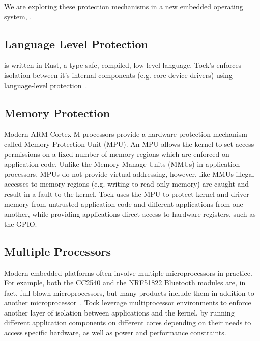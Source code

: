 We are exploring these protection mechanisms in a new embedded operating system,
\name.

\subsection{Language Level Protection}

\name is written in Rust, a type-safe, compiled, low-level language. Tock's
enforces isolation between it's internal components (e.g. core device drivers)
using language-level protection~.

\subsection{Memory Protection}

Modern ARM Cortex-M processors provide a hardware protection mechanism called
Memory Protection Unit (MPU).  An MPU allows the kernel to set access
permissions on a fixed number of memory regions which are enforced on
application code. Unlike the Memory Manage Units (MMUs) in application
processors, MPUs do not provide virtual addressing, however, like MMUs illegal
accesses to memory regions (e.g. writing to read-only memory) are caught and
result in a fault to the kernel. Tock uses the MPU to protect kernel and driver
memory from untrusted application code and different applications from one
another, while providing applications direct access to hardware registers, such
as the GPIO.

\subsection{Multiple Processors}

Modern embedded platforms often involve multiple microprocessors in practice.
For example, both the CC2540 and the NRF51822 Bluetooth modules are, in fact,
full blown microprocessors, but many products include them in addition to
another microprocessor~. Tock leverage
multiprocessor environments to enforce another layer of isolation between
applications and the kernel, by running different application components on
different cores depending on their needs to access specific hardware, as well as
power and performance constraints.

